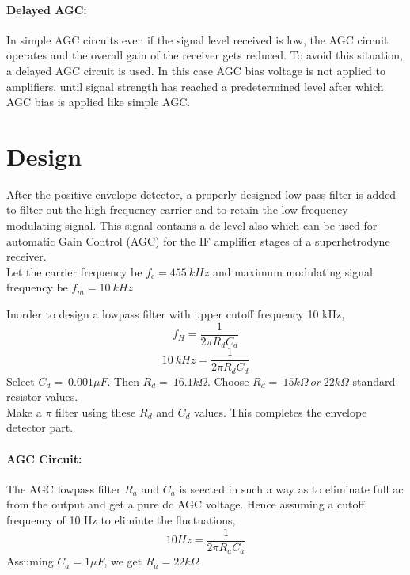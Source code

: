 \paragraph{Delayed AGC:}In simple AGC circuits even if the signal level received is low, the AGC circuit operates and the overall gain of the receiver gets reduced. To avoid this situation, a delayed AGC circuit is used. In this case AGC bias voltage is not applied to amplifiers, until signal strength has reached a predetermined level after which AGC bias is applied like simple AGC.

\section*{Design}

After the positive envelope detector, a properly designed low pass filter is added to filter out the high frequency carrier and to retain the low frequency modulating signal. This signal contains a dc level also which can be used for automatic Gain Control (AGC) for the IF amplifier stages of a superhetrodyne receiver.\\

\noindent Let the carrier frequency be $f_c=455\ kHz$ and maximum modulating signal frequency be $f_m=10\ kHz$

\noindent Inorder to design a lowpass filter with upper cutoff frequency 10 kHz,
\begin{equation}
f_H=\frac{1}{2\pi R_dC_d}
\end{equation}
\begin{equation}
10\ kHz=\frac{1}{2\pi R_dC_d}
\end{equation}
\noindent Select $C_d=\ 0.001 \mu F$. Then $R_d=\ 16.1k\Omega$.
Choose $R_d=\ 15k\Omega \ or\ 22k\Omega$ standard resistor values.\\

\noindent Make a $\pi$ filter using these $R_d$ and $C_d$ values. This completes the envelope detector part.
\paragraph{AGC Circuit:} The AGC lowpass filter $R_a$ and $C_a$ is seected in such a way as to eliminate full ac from the output and get a pure dc AGC voltage. 
Hence assuming a cutoff frequency of 10 Hz to eliminte the fluctuations,
\begin{equation}
10 Hz= \frac{1}{2\pi R_aC_a}
\end{equation}
\noindent Assuming $C_a=1 \mu F$, we get $R_a=22 k \Omega$

